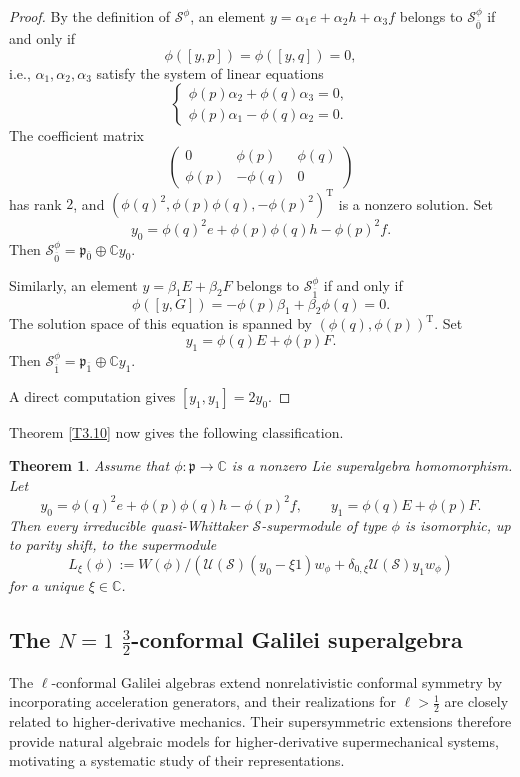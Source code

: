 \documentclass[12pt,reqno]{article}
\newtheorem{thm}{Theorem}[section]
\def\o{\overline}
\def\a{\alpha}
\def\b{\beta}
\def\F{\mathfrak}
\def\r{\mathrm}
\def\C{\mathcal}
\def\CC{\mathbb{C}}
\def\beqn{\begin{equation*}}
\def\eeqn{\end{equation*}}
\def\({\left(}
\def\){\right)}
\begin{document}
\begin{proof}
	By the definition of $\C{S}^\phi$, an element  $y=\a_1 e+ \a_2h+\a_3f$ belongs to $\C{S}_{\o{0}}^\phi$ if and only if 
	\beqn
	\phi([y,p])=\phi([y,q])=0,
	\eeqn
	i.e., $\a_1,\a_2,\a_3$ satisfy the system of linear equations
	\beqn
	\left\{\begin{array}{c}
\phi(p)\a_2+\phi(q)\a_3 =0,\\
\phi(p)\a_1-\phi(q)\a_2=0.
\end{array}
\right.
	\eeqn
The coefficient matrix
\beqn
\begin{pmatrix}
	0 & \phi(p) & \phi(q)\\
	\phi(p) & -\phi(q) & 0
\end{pmatrix}
\eeqn
has rank $2$, and $(\phi(q)^2,\phi(p)\phi(q),-\phi(p)^2)^\r{T}$ is a nonzero solution. Set
\beqn
y_0=\phi(q)^2e+\phi(p)\phi(q)h-\phi(p)^2f.
\eeqn
Then $\C{S}_{\o{0}}^\phi=\F{p}_{\o{0}}\oplus \CC y_0$. 

Similarly, an element $y=\b_1E+\b_2F$ belongs to $\C{S}_{\o{1}}^\phi$ if and only if 
\beqn
\phi([y,G])=-\phi(p)\b_1 +\b_2 \phi(q)=0.
\eeqn
The solution space of this equation is spanned by $(\phi(q),\phi(p))^\r{T}$. Set
\beqn
y_1=\phi(q)E+\phi(p)F.
\eeqn
Then $\C{S}_{\o{1}}^\phi=\F{p}_{\o{1}}\oplus \CC y_1$. 

A direct computation gives $[y_1,y_1]=2y_0$.
\end{proof}

Theorem \ref{T3.10} now gives the following classification.


\begin{thm}
Assume that $\phi\colon\F{p}\rightarrow\CC$ is a nonzero Lie superalgebra homomorphism. Let
\beqn
y_0=\phi(q)^2e+\phi(p)\phi(q)h-\phi(p)^2f,\qquad y_1=\phi(q)E+\phi(p)F.
\eeqn
Then every irreducible quasi-Whittaker $\C{S}$-supermodule of type $\phi$ is isomorphic, up to parity shift, to the supermodule 
\beqn
L_\xi(\phi):= W(\phi)\big/\(\C{U}(\C{S})(y_0-\xi1)w_\phi+\delta_{0,\xi}\C{U}(\C{S})y_1w_\phi\)
\eeqn 
 for a unique $\xi\in\CC$.
\end{thm}
 
\subsection{The $N=1$ $\frac{3}{2}$-conformal Galilei superalgebra}

The $\ell$-conformal Galilei algebras \cite{GM} extend nonrelativistic conformal symmetry by incorporating acceleration generators, and their realizations for $\ell>\frac{1}{2}$ are closely related to higher-derivative mechanics. Their supersymmetric extensions therefore provide natural algebraic models for higher-derivative supermechanical systems, motivating a systematic study of their representations.
\end{document}
